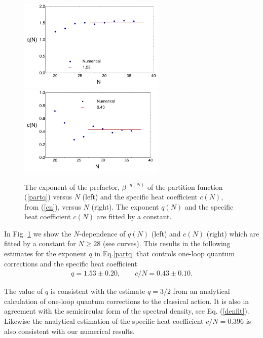 \documentclass[aps,showpacs,floatfix,superscriptaddress,pre,11pt]{revtex4-1}
\newcommand{\eref}[1]{(\ref{#1})}
\newcommand{\be}{\begin{eqnarray}}
\newcommand{\ee}{\end{eqnarray}}
\begin{document}
     \begin{figure}[t!]
    	\centering
    	\includegraphics[width=7cm]{qnant.pdf}
    	\includegraphics[width=7cm]{cnant.pdf}
    	\caption{The exponent of the prefactor, $\beta^{-q(N) } $ of the partition function (\ref{partq}) versus $N$ (left) and 
    		the specific heat coefficient $c(N)$, from (\ref{cn}), versus $N$ (right). The exponent $q(N)$ and the specific heat coefficient 
    	 $c(N)$ are fitted by a constant.}
    	\label{ab}
    \end{figure}

     In Fig. \ref{ab} we show the $N$-dependence of $q(N) $ (left) and $c(N)$ (right)
     which are fitted by a constant for $N \ge 28$ (see curves). This results in the following estimates
   for the exponent $q$ in Eq.\ref{partq} that controls one-loop quantum corrections and the specific heat coefficient
   \be
   q = 1.53 \pm 0.20, \qquad c/N = 0.43 \pm 0.10.
   \ee

   

   
   The value of $q$ is consistent with the estimate $q = 3/2$ \cite{maldacena2016} from an analytical calculation of one-loop quantum corrections to the classical action.
   It is also in agreement with the semicircular form of the spectral density, see
   Eq. \eref{denfit}. %
   Likewise the analytical estimation of the specific heat coefficient $c/N = 0.396$ \cite{maldacena2016} is also consistent with our numerical results. 
      
   

   

   
   
\end{document}
